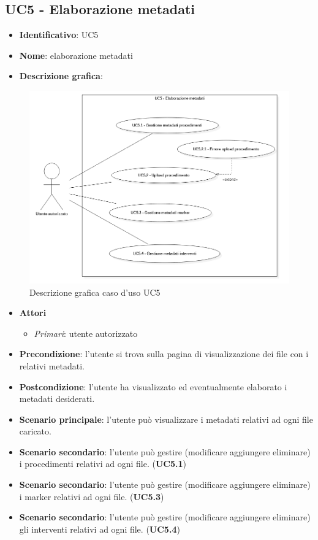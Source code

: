 \subsection{UC5 - Elaborazione metadati}
\begin{itemize}
  \item \textbf{Identificativo}: UC5
  \item \textbf{Nome}: elaborazione metadati
  \item \textbf{Descrizione grafica}:
\end{itemize}

\begin{figure}[h]
  \centering
  \includegraphics[scale=2]{immagini/usecase/UC5.png}
  \caption{Descrizione grafica caso d'uso UC5}
\end{figure}

\begin{itemize}
  \item \textbf{Attori}
        \begin{itemize}
          \item \textit{Primari}: utente autorizzato
        \end{itemize}
  \item \textbf{Precondizione}: l'utente si trova sulla pagina di visualizzazione dei file con i relativi metadati.
  \item \textbf{Postcondizione}: l'utente ha visualizzato ed eventualmente elaborato i metadati desiderati.
  \item \textbf{Scenario principale}: l'utente può visualizzare i metadati relativi ad ogni file caricato.
  \item \textbf{Scenario secondario}: l'utente può gestire (modificare aggiungere eliminare) i procedimenti relativi ad ogni file. (\textbf{UC5.1})
  \item \textbf{Scenario secondario}: l'utente può gestire (modificare aggiungere eliminare) i marker relativi ad ogni file. (\textbf{UC5.3})
  \item \textbf{Scenario secondario}: l'utente può gestire (modificare aggiungere eliminare) gli interventi relativi ad ogni file. (\textbf{UC5.4})
\end{itemize}

